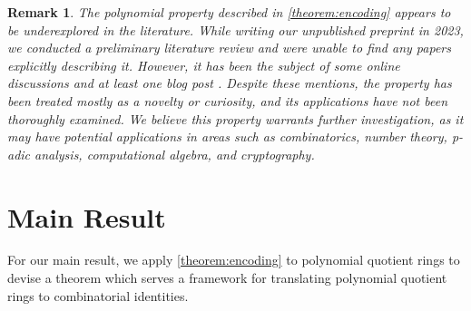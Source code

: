 \documentclass[11pt,reqno]{article}
\theoremstyle{plain}
\newtheorem{remark}{Remark}
\theoremstyle{definition}
\begin{document}
\begin{remark}
The polynomial property described in \cref{theorem:encoding} appears to be underexplored in the literature. While writing our unpublished preprint \cite{shunia2023simple} in 2023, we conducted a preliminary literature review and were unable to find any papers explicitly describing it. However, it has been the subject of some online discussions \cite{mathoverflow2012application, reddit2023determine} and at least one blog post \cite{jcook2012polynomial}. Despite these mentions, the property has been treated mostly as a novelty or curiosity, and its applications have not been thoroughly examined. We believe this property warrants further investigation, as it may have potential applications in areas such as combinatorics, number theory, p-adic analysis, computational algebra, and cryptography.
\end{remark}

\section{Main Result} \label{section:results}
For our main result, we apply \cref{theorem:encoding} to polynomial quotient rings to devise a theorem which serves a framework for translating polynomial quotient rings to combinatorial identities.
\end{document}
